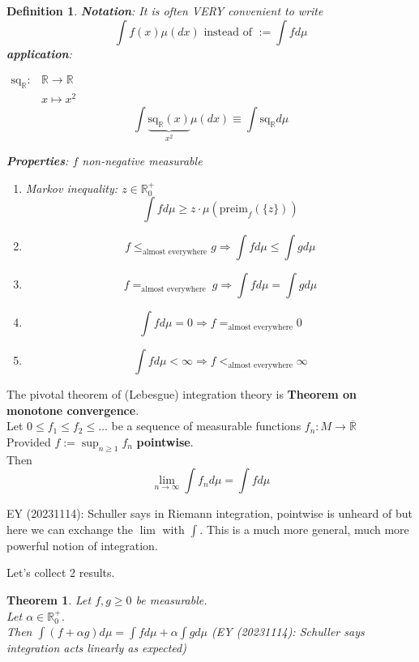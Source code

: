 \documentclass[10pt]{amsart}
\newtheorem{theorem}{Theorem}
\newtheorem{definition}{Definition}
\begin{document}
\begin{multicols*}{2}
\begin{definition}
\textbf{Notation}: It is often VERY convenient to write 
\[
\int f(x) \mu(dx) \text{ instead of } := \int f d\mu
\]
\textbf{application}: 

$\begin{aligned}
	\text{sq}_{\mathbb{R}} : & \mathbb{R} \to \mathbb{R} \\
	& x \mapsto x^2 
\end{aligned}$
\[
\int \underbrace{ \text{sq}_{\mathbb{R}}(x) }_{x^2} \mu(dx) \equiv   \int \text{sq}_{\mathbb{R}} d\mu
\]

\textbf{Properties}: $f$ \emph{non-negative} measurable
\begin{enumerate}
	\item[(i)] Markov inequality: $z \in \mathbb{R}^+_0$
	\[
	\int f d\mu \geq z \cdot \mu(\text{preim}_f(\lbrace z \rbrace))
	\]
	\item[(ii)] 
	\[
	f \leq_{\text{almost everywhere}} g \Longrightarrow \int f d\mu \leq \int g d\mu
	\]
	\item[(iii)] 
	\[
	f =_{\text{almost everywhere }} g \Longrightarrow \int f d\mu = \int g d\mu
	\]
	\item[(iv)] 
	\[
	\int f d\mu = 0 \Longrightarrow f =_{\text{almost everywhere} } 0 
	\]
	\item[(v)]
	\[
	\int f d\mu < \infty \Longrightarrow f <_{\text{almost everywhere}} \infty
	\]
\end{enumerate}

\end{definition}

The pivotal theorem of (Lebesgue) integration theory is \textbf{Theorem on monotone convergence}. \\

Let $0 \leq f_1 \leq f_2 \leq \dots$ be a sequence of measurable functions $f_n: M \to \overline{\mathbb{R}}$ \\

Provided $f := \sup_{n \geq 1} f_n$ \textbf{pointwise}. \\

Then
\[
\lim_{n\to \infty} \int f_n d\mu = \int f d\mu
\]

EY (20231114): Schuller says in Riemann integration, pointwise is unheard of but here we can exchange the $\lim$ with $\int$. This is a much more general, much more powerful notion of integration.

Let's collect 2 results.

\begin{theorem}
	Let $f,g \geq 0$ be measurable. \\
	Let $\alpha \in \mathbb{R}^+_0$. \\
	Then $\int (f + \alpha g) d\mu = \int f d\mu + \alpha \int g d\mu$ (EY (20231114): Schuller says integration acts linearly as expected) 
\end{theorem}


\end{multicols*}
\end{document}
